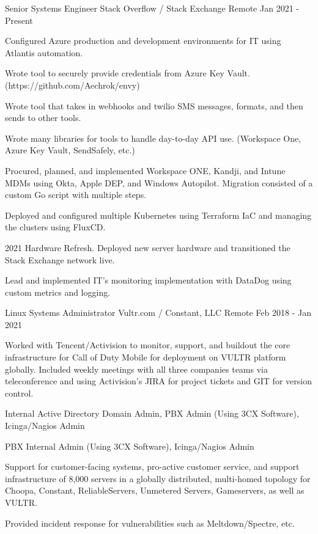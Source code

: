 
\begin{cventries}

	\cventry
	{Senior Systems Engineer}
	{Stack Overflow / Stack Exchange}
	{Remote}
	{Jan 2021 - Present}
	{
		\begin{cvitems}
		\item {Configured Azure production and development environments for IT using Atlantis automation.}
		\item {Wrote tool to securely provide credentials from Azure Key Vault. (https://github.com/Aechrok/envy)}
		\item {Wrote tool that takes in webhooks and twilio SMS messages, formats, and then sends to other tools.}
		\item {Wrote many libraries for tools to handle day-to-day API use. (Workspace One, Azure Key Vault, SendSafely, etc.)}
		\item {Procured, planned, and implemented Workspace ONE, Kandji, and Intune MDMs using Okta, Apple DEP, and Windows Autopilot. Migration consisted of a custom Go script with multiple steps.}
		\item {Deployed and configured multiple Kubernetes using Terraform IaC and managing the clusters using FluxCD.}
		\item {2021 Hardware Refresh. Deployed new server hardware and transitioned the Stack Exchange network live.}
		\item {Lead and implemented IT's monitoring implementation with DataDog using custom metrics and logging.}
		\end{cvitems}
	}


	\cventry
	{Linux Systems Administrator}
	{Vultr.com / Constant, LLC}
	{Remote}
	{Feb 2018 - Jan 2021}
	{
		\begin{cvitems}
		\item {Worked with Tencent/Activision to monitor, support, and buildout the core infrastructure for Call of Duty Mobile for deployment on VULTR platform globally. Included weekly meetings with all three companies teams via teleconference and using Activision's JIRA for project tickets and GIT for version control.}
		\item {Internal Active Directory Domain Admin, PBX Admin (Using 3CX Software), Icinga/Nagios Admin}
		\item {PBX Internal Admin (Using 3CX Software), Icinga/Nagios Admin}
		\item {Support for customer-facing systems, pro-active customer service, and support infrastructure of 8,000 servers in a globally distributed, multi-homed topology for Choopa, Constant, ReliableServers, Unmetered Servers, Gameservers, as well as VULTR.}
		\item {Provided incident response for vulnerabilities such as Meltdown/Spectre, etc.}
		\end{cvitems}
	}


\end{cventries}
